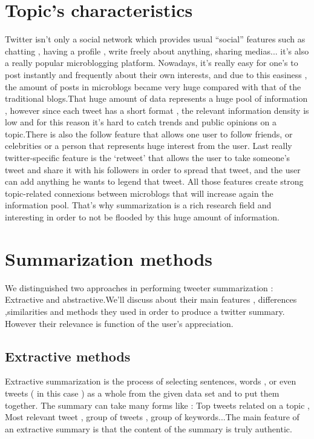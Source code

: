 \documentclass[a4paper, twocolumn]{article}
\begin{document}
\section{Topic's characteristics}

Twitter isn’t only a social network which provides usual “social” features such
as chatting , having a profile , write freely about anything, sharing medias...
it’s also a really popular microblogging platform. Nowadays, it’s really easy
for one’s  to post instantly and frequently about their own interests, and due
to this easiness , the amount of posts in microblogs became very huge compared
with that of the traditional blogs.That huge amount of data represents a huge
pool of information , however since each tweet has a short format , the
relevant information density is low and for this reason it’s hard to catch
trends and public opinions on a topic.There is also the follow feature that
allows one user to follow friends, or celebrities or a person that represents
huge interest from the user. Last really twitter-specific feature is the
‘retweet’ that allows the user to take someone’s tweet and share it with his
followers in order to spread that tweet, and the user can add anything he wants
to legend that tweet. All those features create strong topic-related connexions
between microblogs that will increase again the information pool. That’s why
summarization is a rich research field and interesting in order to not be
flooded by this huge amount of information.

\section{Summarization methods}

We distinguished two approaches in performing tweeter summarization :
Extractive and abstractive.We’ll discuss about their main features ,
differences ,similarities and methods they used in order to produce a twitter
summary. However their relevance is function of the user’s  appreciation.

\subsection{Extractive methods}

Extractive summarization is the process of selecting sentences, words , or even
tweets  ( in this case )  as a whole   from the given data set and to put them
together. The summary can take many forms like : Top tweets related on a topic
, Most relevant tweet , group of tweets  , group of keywords...The main feature
of an extractive summary is that the content of the summary is truly authentic.
\end{document}
